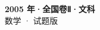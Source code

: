 \documentclass[zihao=-4, a4paper]{ctexart}
\begin{document}
\begin{center}
  {\Large\bfseries 2005 年·全国卷Ⅱ·文科}\\[4pt]
  {\large 数学 · 试题版}
\end{center}
\medskip
{}

\end{document}
